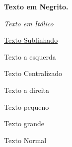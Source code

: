 \documentclass[12pt]{article}
\begin{document}
	
	\textbf{Texto em Negrito.}
	
	\textit{Texto em Itálico}
	
	\underline{Texto Sublinhado}
	
	\begin{flushleft}
		Texto a esquerda
	\end{flushleft}
	
	\begin{center}
		Texto Centralizado
	\end{center}
	
	\begin{flushright}
		Texto a direita
	\end{flushright}
	
	{\tiny Texto pequeno}
	
	{\Huge Texto grande}
	
	Texto Normal
	
\end{document}
